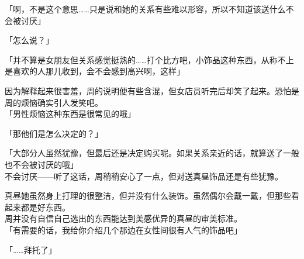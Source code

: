 「啊，不是这个意思……只是说和她的关系有些难以形容，所以不知道该送什么不会被讨厌」

「怎么说？」

「并不算是女朋友但关系感觉挺熟的……打个比方吧，小饰品这种东西，从称不上是喜欢的人那儿收到，会不会感到高兴啊，这样」

因为解释起来很害羞，周的说明便有些含混，但女店员听完后却笑了起来。恐怕是周的烦恼确实引人发笑吧。\\

「男性烦恼这种东西是很常见的哦」

「那他们是怎么决定的？」

「大部分人虽然犹豫，但最后还是决定购买呢。如果关系亲近的话，就算送了一般也不会被讨厌的哦」\\

不会讨厌——听了这话，周稍稍安心了一点，但对送真昼饰品还是有些犹豫。

真昼她虽然身上打理的很整洁，但并没有什么装饰。虽然偶尔会戴一戴，但那些看起来都是好东西。\\

周并没有自信自己选出的东西能达到美感优异的真昼的审美标准。\\

「有需要的话，我给你介绍几个那边在女性间很有人气的饰品吧」

「……拜托了」\\

